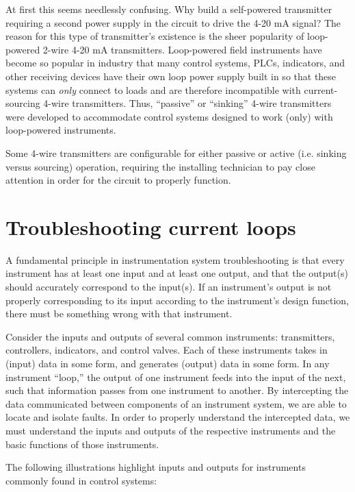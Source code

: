 At first this seems needlessly confusing.  Why build a self-powered transmitter requiring a second power supply in the circuit to drive the 4-20 mA signal?  The reason for this type of transmitter's existence is the sheer popularity of loop-powered 2-wire 4-20 mA transmitters.  Loop-powered field instruments have become so popular in industry that many control systems, PLCs, indicators, and other receiving devices have their own loop power supply built in so that these systems can \textit{only} connect to loads and are therefore incompatible with current-sourcing 4-wire transmitters.  Thus, ``passive'' or ``sinking'' 4-wire transmitters were developed to accommodate control systems designed to work (only) with loop-powered instruments.

Some 4-wire transmitters are configurable for either passive or active (i.e. sinking versus sourcing) operation, requiring the installing technician to pay close attention in order for the circuit to properly function.






\filbreak
\section{Troubleshooting current loops}

A fundamental principle in instrumentation system troubleshooting is that every instrument has at least one input and at least one output, and that the output(s) should accurately correspond to the input(s).  If an instrument's output is not properly corresponding to its input according to the instrument's design function, there must be something wrong with that instrument.

Consider the inputs and outputs of several common instruments: transmitters, controllers, indicators, and control valves.  Each of these instruments takes in (input) data in some form, and generates (output) data in some form.  In any instrument ``loop,'' the output of one instrument feeds into the input of the next, such that information passes from one instrument to another.  By intercepting the data communicated between components of an instrument system, we are able to locate and isolate faults.  In order to properly understand the intercepted data, we must understand the inputs and outputs of the respective instruments and the basic functions of those instruments.

The following illustrations highlight inputs and outputs for instruments commonly found in control systems:

